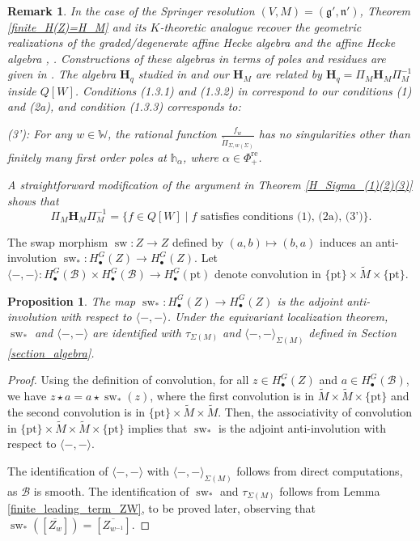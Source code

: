 \documentclass[11pt]{article}
\newcommand{\B}{\mathcal{B}}
\renewcommand{\H}{\textbf{H}}
\newcommand{\g}{\mathfrak{g}}
\newcommand{\1}{\mathbb{1}}
\renewcommand{\th}{\mathbb{h}}
\newcommand{\tW}{\mathbb{W}}
\newcommand{\tPi}{\widetilde{\Pi}}
\newcommand{\HBM}[2]{H_\bullet^{#1}(#2)}
\newcommand{\tM}{\widetilde{M}}
\newcommand{\pt}{\text{pt}}
\newcommand{\bbPhire}{\mathbb{\Phi}^\text{re}}
\newcommand{\sw}{\operatorname{sw}}
\newtheorem{proposition}[theorem]{Proposition}
\newtheorem{remark}[theorem]{Remark}
\theoremstyle{definition}
\numberwithin{equation}{section}
\begin{document}
\begin{remark}
\label{finite_Springer_remark}
    In the case of the Springer resolution $(V,M)=(\g',\mathfrak{n}')$, Theorem \ref{finite_H(Z)=H_M} and its $K$-theoretic analogue recover the geometric realizations of the graded/degenerate affine Hecke algebra \cite{Lu} and the affine Hecke algebra \cite{KL}, \cite{Gi2}. Constructions of these algebras in terms of poles and residues are given in \cite{GKV}. The algebra $\H_q$ studied in \cite{GKV} and our $\H_M$ are related by $\H_q = \Pi_M \H_M \Pi_M^{-1}$ inside $Q[W]$. Conditions (1.3.1) and (1.3.2) in \cite{GKV} correspond to our conditions (1) and (2a), and condition (1.3.3) corresponds to:
    
    \noindent (3'): For any $w\in \tW$, the rational function $\frac{f_w}{\tPi_{\Sigma,w(\Sigma)}}$ has no singularities other than finitely many first order poles at $\th_{\alpha}$, where $\alpha \in \bbPhire_+$.
    
    \noindent A straightforward modification of the argument in Theorem \ref{H_Sigma_(1)(2)(3)} shows that 
    $$\Pi_M\H_M \Pi_M^{-1} = \{ f \in Q[W] \mid f \text{ satisfies conditions (1), (2a), (3')}\}.$$
\end{remark}

The swap morphism $\sw:Z \rightarrow Z$ defined by $(a,b)\mapsto (b,a)$ induces an anti-involution $\sw_*:\HBM{G}{Z} \rightarrow \HBM{G}{Z}$. Let $
    \langle -,- \rangle : \HBM{G}{\B} \times \HBM{G}{\B} \rightarrow \HBM{G}{\pt}$ denote convolution in $\{ \pt \} \times \tM \times \{ \pt \}$.

\begin{proposition}
    The map $\sw_* : \HBM{G}{Z} \rightarrow \HBM{G}{Z}$ is the adjoint anti-involution with respect to $\langle -,- \rangle$. Under the equivariant localization theorem, $\sw_*$ and $\langle -, -\rangle$ are identified with $\tau_{\Sigma(M)}$ and $\langle-,-\rangle_{\Sigma(M)}$ defined in Section \ref{section_algebra}.
\end{proposition}

\begin{proof}
    Using the definition of convolution, for all $z\in \HBM{G}{Z}$ and $a\in \HBM{G}{\B}$, we have $z \star a =a \star \sw_*(z)$, where the first convolution is in $\tM\times\tM\times\{\pt\}$ and the second convolution is in $\{\pt\}\times\tM\times\tM$. Then, the associativity of convolution in $\{ \pt \} \times \tM \times \tM \times \{ \pt\}$ implies that $\sw_*$ is the adjoint anti-involution with respect to $\langle -, - \rangle$.

    The identification of $\langle-, -\rangle$ with $\langle-,-\rangle_{\Sigma(M)}$ follows from direct computations, as $\B$ is smooth. The identification of $\sw_*$ and $\tau_{\Sigma(M)}$ follows from Lemma \ref{finite_leading_term_ZW}, to be proved later, observing that $\sw_*\left([\overline{Z_w}]\right) = [\overline{Z_{w^{-1}}}]$.
\end{proof}
\end{document}
